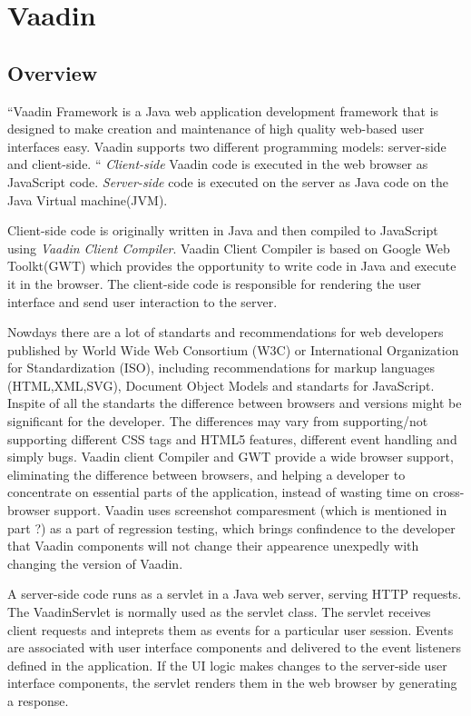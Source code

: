 	\chapter {Vaadin}
	\label{ch:vaadin}
	\section{Overview}
	 ``Vaadin Framework is a Java web application development framework that is
	designed to make creation and maintenance of high quality web-based user interfaces easy.
	 Vaadin supports two different programming models: server-side and client-side. 
	 `` \cite[pr1.1]{bookVaaidn}
	 \emph{Client-side} Vaadin code is executed in the web browser as JavaScript
	 code.
	 \emph{Server-side} code is executed on the server as Java code on the Java
	 Virtual machine(JVM).
	 
	 Client-side code is originally written in Java and then
	 compiled to JavaScript using \emph{Vaadin Client Compiler}. Vaadin Client Compiler is based on Google
	 Web Toolkt(GWT) which provides the opportunity to write code in Java and
	 execute it in the browser. The client-side code is responsible for rendering
	 the user interface and send user interaction to the server.
	
	 Nowdays there are a lot of standarts and recommendations for web
	 developers published by World Wide Web Consortium (W3C) or  International
	 Organization for Standardization (ISO), including recommendations for
	 markup languages (HTML,XML,SVG), Document Object Models and standarts
	 for JavaScript. Inspite of all the standarts the difference between browsers
	 and versions might be significant for the developer. The differences may vary
	 from supporting/not supporting different CSS tags and HTML5 features,
	 different event handling and simply bugs. Vaadin client Compiler and GWT provide a wide browser
	 support, eliminating the difference between browsers, and helping a
	 developer to concentrate on essential parts of the application, instead of
	 wasting time on cross-browser support. Vaadin uses screenshot comparesment
	 (which is mentioned in part ?) as a part of regression testing, which brings
	 confindence to the developer that Vaadin components will not change their
	 appearence unexpedly with changing the version of Vaadin. 
	 
	 A server-side code runs as a servlet in a Java web server, serving HTTP
	 requests.
	 The VaadinServlet is normally used as the servlet class. The servlet receives client requests
	 and inteprets them as events for a particular user session.
	 Events are associated with user interface components and delivered to the event listeners defined in the application.
	 If the UI logic makes changes to the server-side user interface components, 
	 the servlet renders them in the web browser by generating a response.
	 
